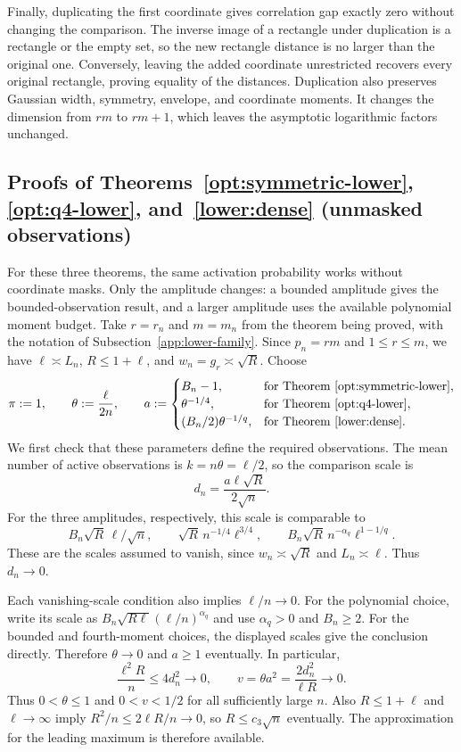 \documentclass[11pt,letterpaper,twoside,leqno]{article}
\theoremstyle{bookplain}
\theoremstyle{bookremark}
\begin{document}
Finally, duplicating the first coordinate gives correlation gap
exactly zero without changing the comparison. The inverse image
of a rectangle under duplication is a rectangle or the empty set,
so the new rectangle distance is no larger than the original one.
Conversely, leaving the added coordinate unrestricted recovers
every original rectangle, proving equality of the distances.
Duplication also preserves Gaussian width, symmetry, envelope,
and coordinate moments. It changes the dimension from $rm$ to
$rm+1$, which leaves the asymptotic logarithmic factors unchanged.

\subsection{Proofs of Theorems~\ref*{opt:symmetric-lower}, \ref*{opt:q4-lower}, and~\ref*{lower:dense} (unmasked observations)}
\label{app:symmetric-lower}

For these three theorems, the same activation probability works
without coordinate masks. Only the amplitude changes: a bounded
amplitude gives the bounded-observation result, and a larger
amplitude uses the available polynomial moment budget.
Take $r=r_n$ and $m=m_n$ from the theorem being proved, with
the notation of Subsection~\ref{app:lower-family}. Since
$p_n=rm$ and $1\le r\le m$, we have
$\ell\asymp L_n$, $R\le1+\ell$, and
$w_n=g_r\asymp\sqrt R$. Choose
\[
 \pi:=1,\qquad \theta:=\frac{\ell}{2n},\qquad
 a:=\begin{cases}
 B_n-1,&\text{for Theorem~\ref{opt:symmetric-lower}},\\
 \theta^{-1/4},&\text{for Theorem~\ref{opt:q4-lower}},\\
 (B_n/2)\theta^{-1/q},&\text{for Theorem~\ref{lower:dense}}.
 \end{cases}
\]
We first check that these parameters define the required observations.
The mean number of active observations is $k=n\theta=\ell/2$,
so the comparison scale is
\[
 d_n=\frac{a\ell\sqrt R}{2\sqrt n}.
\]
For the three amplitudes, respectively, this scale is comparable to
\[
 B_n\sqrt R\,\ell/\sqrt n,\qquad
 \sqrt R\,n^{-1/4}\ell^{3/4},\qquad
 B_n\sqrt R\,n^{-\alpha_q}\ell^{1-1/q}.
\]
These are the scales assumed to vanish, since
$w_n\asymp\sqrt R$ and $L_n\asymp\ell$. Thus $d_n\to0$.

Each vanishing-scale condition also implies $\ell/n\to0$.
For the polynomial choice, write its scale as
$B_n\sqrt{R\ell}(\ell/n)^{\alpha_q}$ and use
$\alpha_q>0$ and $B_n\ge2$. For the bounded and fourth-moment
choices, the displayed scales give the conclusion directly.
Therefore $\theta\to0$ and $a\ge1$ eventually. In particular,
\[
 \frac{\ell^2R}{n}\le4d_n^2\to0,\qquad
 v=\theta a^2=\frac{2d_n^2}{\ell R}\to0.
\]
Thus $0<\theta\le1$ and $0<v<1/2$ for all sufficiently large
$n$. Also $R\le1+\ell$ and $\ell\to\infty$ imply
$R^2/n\le2\ell R/n\to0$, so $R\le c_3\sqrt n$ eventually.
The approximation for the leading maximum is therefore available.
\end{document}
